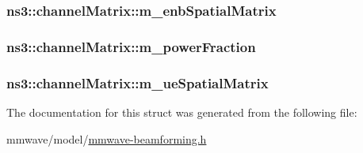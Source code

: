 \subsubsection[{\texorpdfstring{m\+\_\+enb\+Spatial\+Matrix}{m_enbSpatialMatrix}}]{ ns3\+::channel\+Matrix\+::m\+\_\+enb\+Spatial\+Matrix}\hypertarget{structns3_1_1channelMatrix_a1de56012f2e517038a0d8f4e31f37b4e}{}\label{structns3_1_1channelMatrix_a1de56012f2e517038a0d8f4e31f37b4e}
\subsubsection[{\texorpdfstring{m\+\_\+power\+Fraction}{m_powerFraction}}]{ ns3\+::channel\+Matrix\+::m\+\_\+power\+Fraction}\hypertarget{structns3_1_1channelMatrix_a4e2c23479a94f0046d085c7969595fbd}{}\label{structns3_1_1channelMatrix_a4e2c23479a94f0046d085c7969595fbd}
\subsubsection[{\texorpdfstring{m\+\_\+ue\+Spatial\+Matrix}{m_ueSpatialMatrix}}]{ ns3\+::channel\+Matrix\+::m\+\_\+ue\+Spatial\+Matrix}\hypertarget{structns3_1_1channelMatrix_af524c81d5e873af24ca3d994d16c1ee6}{}\label{structns3_1_1channelMatrix_af524c81d5e873af24ca3d994d16c1ee6}


The documentation for this struct was generated from the following file\+:\begin{DoxyCompactItemize}
\item 
mmwave/model/\hyperlink{mmwave-beamforming_8h}{mmwave-\/beamforming.\+h}\end{DoxyCompactItemize}
